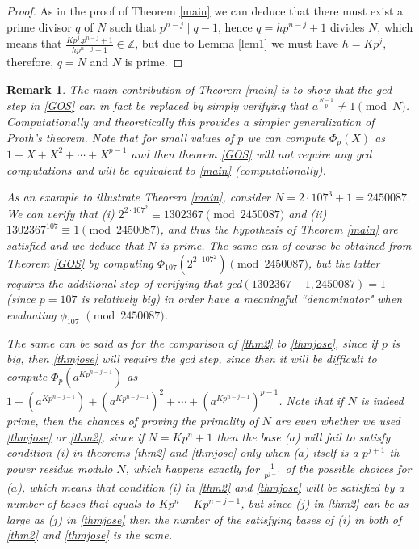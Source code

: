 \documentclass{amsart}
\newtheorem{remark}[theorem]{Remark}
\numberwithin{equation}{section}
\begin{document}
\begin{proof}
	As in the proof of Theorem \ref{main} we can deduce that there must exist a prime divisor $q$ of $N$ such that  $p^{n-j} \mid q-1$,  hence $q=hp^{n-j}+1$ divides $N$, which means that  $\frac{Kp^{j}.p^{n-j}+1}{hp^{n-j}+1}\in \mathbb{Z}$, but due to Lemma \ref{lem1} we must have $h=Kp^{j}$, therefore, $q=N$ and $N$ is prime.
\end{proof}

\begin{remark}
	The main contribution of Theorem \ref{main} is to show that the gcd step in \ref{GOS} can in fact be replaced by simply verifying that $a^{\frac{N-1}{p}} \neq 1 \pmod N$. Computationally and theoretically this provides a simpler generalization of Proth's theorem. Note that for small values of $p$ we can compute $\Phi_p(X)$ as $1+X+X^2+\cdots +X^{p-1}$ and then theorem \ref{GOS} will not require any gcd computations and will be equivalent to \ref{main} (computationally).
	
	As an example to illustrate Theorem \ref{main}, consider $N=2\cdot107^3+1=2450087$. We can verify that (i) $2^{2\cdot107^2} \equiv 1302367 \pmod {2450087}$ and (ii)$1302367^{107} \equiv 1 \pmod {2450087}$, and thus the hypothesis of Theorem \ref{main} are satisfied and we deduce that $N$ is prime. The same can of course be obtained from Theorem \ref{GOS} by computing $\Phi_{107}(2^{2\cdot107^2})\pmod {2450087}$, but the latter requires the additional step of verifying that gcd$(1302367-1, 2450087)=1$ (since $p=107$ is relatively big) in order have a meaningful ``denominator" when evaluating $\phi_{107}$ $\pmod {2450087}$. 
	
	The same can be said as for the comparison of \ref{thm2} to \ref{thmjose}, since if $p$ is big, then \ref{thmjose} will require the gcd step, since then it will be difficult to compute $\Phi_p(a^{Kp^{n-j-1}})$ as $1+(a^{Kp^{n-j-1}})+(a^{Kp^{n-j-1}})^2+ \cdots + (a^{Kp^{n-j-1}})^{p-1}$. Note that if $N$ is indeed prime, then the chances of proving the primality of $N$ are even whether we used \ref{thmjose} or \ref{thm2}, since if $N=Kp^n+1$ then the base ($a$) will fail to satisfy condition (i) in theorems \ref{thm2} and \ref{thmjose} only when ($a$) itself is a $p^{j+1}$-th power residue modulo $N$, which happens exactly for $\frac{1}{p^{j+1}}$ of the possible choices for ($a$), which means that condition (i) in \ref{thm2} and \ref{thmjose} will be satisfied by a number of bases that equals to $Kp^n-Kp^{n-j-1}$, but since ($j$) in \ref{thm2} can be as large as ($j$) in \ref{thmjose} then the number of the satisfying bases of (i) in both of \ref{thm2} and \ref{thmjose} is the same.  
	

\end{remark}
\end{document}
